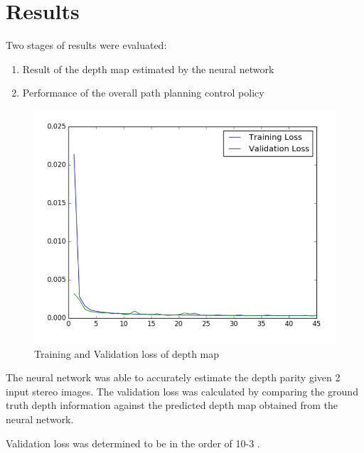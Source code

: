 \section{Results}

Two stages of results were evaluated:
\begin{enumerate}
\item Result of the depth map estimated by the neural network
\item Performance of the overall path planning control policy
\end{enumerate}

\begin{figure}
  \includegraphics[width=\linewidth]{images/validationloss.png}
  \caption{Training and Validation loss of depth map}
  \label{fig:boat1}
\end{figure}

The neural network was able to accurately estimate the depth parity given 2 input stereo images. The validation loss was calculated by comparing the ground truth depth information against the predicted depth map obtained from the neural network.

Validation loss was determined to be in the order of 10-3 . 

